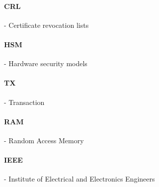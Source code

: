 \paragraph{CRL} - Certificate revocation lists

\paragraph{HSM} - Hardware security models

\paragraph{TX} - Transaction

\paragraph{RAM} - Random Access Memory

\paragraph{IEEE} - Institute of Electrical and Electronics Engineers

\newpage